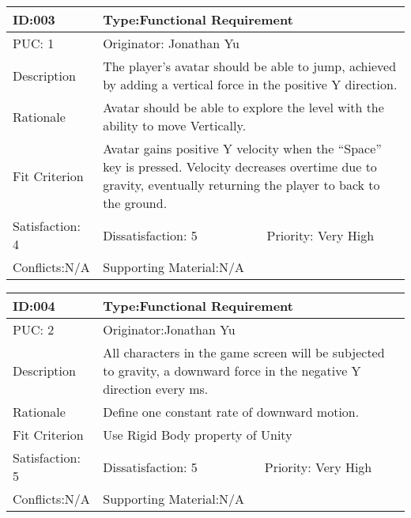 \documentclass{article}
\begin{document}
	\begin{table}[H]
		\begin{tabular}{|l|l|l|}
			\hline
			ID:003&\multicolumn{2}{l|}{Type:Functional Requirement} \\ \hline
			PUC: 1& \multicolumn{2}{l|}{Originator: Jonathan Yu} \\ \hline
			Description & \multicolumn{2}{m{0.85\textwidth}|}{The player’s avatar should be able to jump, achieved by adding a vertical force in the positive Y direction.}\\\hline
			Rationale & \multicolumn{2}{m{0.85\textwidth}|}{Avatar should be able to explore the level with the ability to move Vertically.} \\ \hline
			Fit Criterion & \multicolumn{2}{m{0.85\textwidth}|}{Avatar gains positive Y velocity when the “Space” key is pressed. Velocity decreases overtime due to gravity, eventually returning the player to back to the ground.} \\ \hline
			Satisfaction: 4 & Dissatisfaction: 5 & Priority: Very High \\ \hline
			Conflicts:N/A & \multicolumn{2}{l|}{Supporting Material:N/A} \\ \hline
		\end{tabular}
	\end{table}

	\begin{table}[H]
		\begin{tabular}{|l|l|l|}
			\hline
			ID:004 & \multicolumn{2}{l|}{Type:Functional Requirement} \\ \hline
			PUC: 2& \multicolumn{2}{l|}{Originator:Jonathan Yu} \\ \hline
			Description & \multicolumn{2}{m{0.85\textwidth}|}{All characters in the game screen will be subjected to gravity, a downward force in the negative Y direction every ms.} \\ \hline
			Rationale & \multicolumn{2}{m{0.85\textwidth}|}{Define one constant rate of downward motion.} \\ \hline
			Fit Criterion & \multicolumn{2}{m{0.85\textwidth}|}{Use Rigid Body property of Unity} \\ \hline
			Satisfaction: 5 & Dissatisfaction: 5 & Priority: Very High \\ \hline
			Conflicts:N/A & \multicolumn{2}{l|}{Supporting Material:N/A} \\ \hline
		\end{tabular}
	\end{table}
\end{document}
